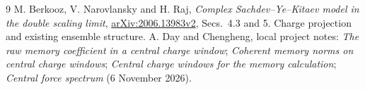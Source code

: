 \documentclass[11pt,a4paper]{article}
\begin{document}
\begin{thebibliography}{9}\small
{} M. Berkooz, V. Narovlansky and H. Raj,
\emph{Complex Sachdev--Ye--Kitaev model in the double scaling limit},
\href{https://arxiv.org/html/2006.13983v2}{arXiv:2006.13983v2},
Secs.~4.3 and 5. Charge projection and existing ensemble structure.
 A. Day and Chengheng, local project notes:
\emph{The raw memory coefficient in a central charge window};
\emph{Coherent memory norms on central charge windows};
\emph{Central charge windows for the memory calculation};
\emph{Central force spectrum} (6 November 2026).
\end{thebibliography}
\end{document}
